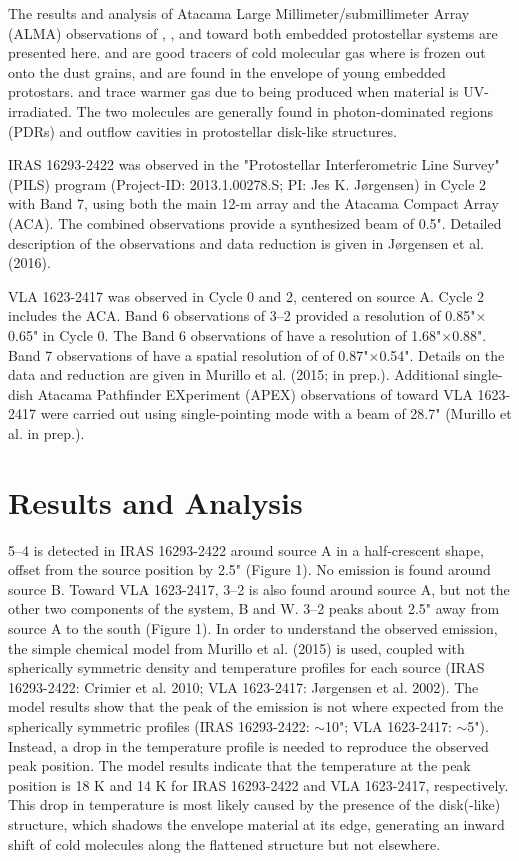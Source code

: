 \documentclass{iaus}
\begin{document}
The results and analysis of Atacama Large Millimeter/submillimeter Array (ALMA) observations of , ,  and  toward both embedded protostellar systems are presented here.
 and  are good tracers of cold molecular gas where  is frozen out onto the dust grains, and are found in the envelope of young embedded protostars.
 and  trace warmer gas due to being produced when material is UV-irradiated.
The two molecules are generally found in photon-dominated regions (PDRs) and outflow cavities in protostellar disk-like structures.

IRAS 16293-2422 was observed in the "Protostellar Interferometric Line Survey" (PILS) program (Project-ID: 2013.1.00278.S; PI: Jes K. J{\o}rgensen) in Cycle 2 with Band 7, using both the main 12-m array and the Atacama Compact Array (ACA). The combined observations provide a synthesized beam of 0.5". Detailed description of the observations and data reduction is given in J{\o}rgensen et al. (2016).

VLA 1623-2417 was observed in Cycle 0 and 2, centered on source A. Cycle 2 includes the ACA. Band 6 observations of  3--2 provided a resolution of 0.85"$\times$0.65" in Cycle 0. The Band 6 observations of  have a resolution of 1.68"$\times$0.88". Band 7 observations of  have a spatial resolution of of 0.87"$\times$0.54".
Details on the data and reduction are given in Murillo et al. (2015; in prep.).
Additional single-dish Atacama Pathfinder EXperiment (APEX) observations of  toward VLA 1623-2417 were carried out using single-pointing mode with a beam of 28.7" (Murillo et al. in prep.).

\section{Results and Analysis}
 5--4 is detected in IRAS 16293-2422 around source A in a half-crescent shape, offset from the source position by 2.5" (Figure 1). 
No  emission is found around source B.
Toward VLA 1623-2417,  3--2 is also found around source A, but not the other two components of the system, B and  W.
 3--2 peaks about 2.5" away from source A to the south (Figure 1).
In order to understand the observed  emission, the simple chemical model from Murillo et al. (2015) is used, coupled with spherically symmetric density and temperature profiles for each source (IRAS 16293-2422: Crimier et al. 2010; VLA 1623-2417: J{\o}rgensen et al. 2002).
The model results show that the peak of the  emission is not where expected from the spherically symmetric profiles (IRAS 16293-2422: $\sim$10"; VLA 1623-2417: $\sim$5").
Instead, a drop in the temperature profile is needed to reproduce the observed  peak position. 
The model results indicate that the temperature at the  peak position is 18 K and 14 K for IRAS 16293-2422 and VLA 1623-2417, respectively.
This drop in temperature is most likely caused by the presence of the disk(-like) structure, which shadows the envelope material at its edge, generating an inward shift of cold molecules along the flattened structure but not elsewhere.
\end{document}
